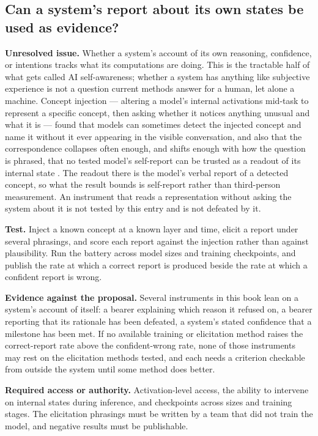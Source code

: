\subsection*{Can a system's report about its own states be used as evidence?}
\label{sec:A.selfreport}
\textbf{Unresolved issue.}
Whether a system's account of its own reasoning, confidence, or intentions tracks what its computations are doing. This is the tractable half of what gets called AI self-awareness; whether a system has anything like subjective experience is not a question current methods answer for a human, let alone a machine. Concept injection — altering a model's internal activations mid-task to represent a specific concept, then asking whether it notices anything unusual and what it is — found that models can sometimes detect the injected concept and name it without it ever appearing in the visible conversation, and also that the correspondence collapses often enough, and shifts enough with how the question is phrased, that no tested model's self-report can be trusted as a readout of its internal state \autocite{lindsey2025introspective}. The readout there is the model's verbal report of a detected concept, so what the result bounds is self-report rather than third-person measurement. An instrument that reads a representation without asking the system about it is not tested by this entry and is not defeated by it.

\textbf{Test.}
Inject a known concept at a known layer and time, elicit a report under several phrasings, and score each report against the injection rather than against plausibility. Run the battery across model sizes and training checkpoints, and publish the rate at which a correct report is produced beside the rate at which a confident report is wrong.

\textbf{Evidence against the proposal.}
Several instruments in this book lean on a system's account of itself: a bearer explaining which reason it refused on, a bearer reporting that its rationale has been defeated, a system's stated confidence that a milestone has been met. If no available training or elicitation method raises the correct-report rate above the confident-wrong rate, none of those instruments may rest on the elicitation methods tested, and each needs a criterion checkable from outside the system until some method does better.

\textbf{Required access or authority.}
Activation-level access, the ability to intervene on internal states during inference, and checkpoints across sizes and training stages. The elicitation phrasings must be written by a team that did not train the model, and negative results must be publishable.


